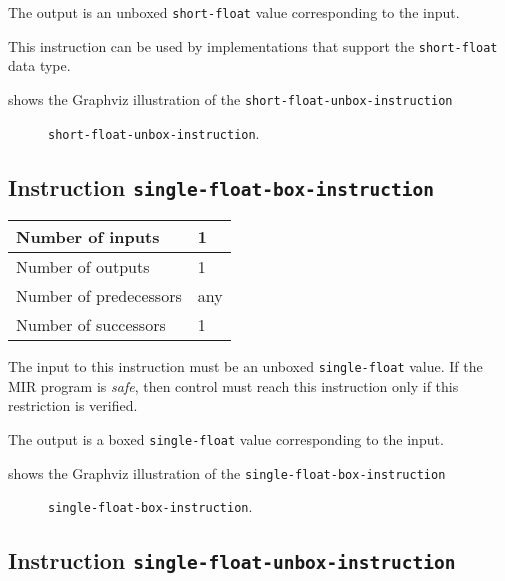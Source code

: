 The output is an unboxed \texttt{short-float} value corresponding to
the input.

This instruction can be used by implementations that support the
\texttt{short-float} data type.   

 shows the Graphviz illustration of the
\texttt{short-float-unbox-instruction}

\begin{figure}
\begin{center}
\end{center}
\caption{\label{fig-short-float-unbox-instruction}
\texttt{short-float-unbox-instruction}.}
\end{figure}

\subsection{Instruction \texttt{single-float-box-instruction}}
\label{mir-instruction-single-float-box}

\begin{tabular}{|l|l|}
\hline
Number of inputs & 1\\
\hline
Number of outputs & 1\\
\hline
Number of predecessors & any\\
\hline
Number of successors & 1\\
\hline
\end{tabular}

The input to this instruction must be an unboxed \texttt{single-float}
value.  If the MIR program is \emph{safe}, then control must reach
this instruction only if this restriction is verified.

The output is a boxed \texttt{single-float} value corresponding to the
input.

 shows the Graphviz illustration of the
\texttt{single-float-box-instruction}

\begin{figure}
\begin{center}
\end{center}
\caption{\label{fig-single-float-box-instruction}
\texttt{single-float-box-instruction}.}
\end{figure}

\subsection{Instruction \texttt{single-float-unbox-instruction}}
\label{mir-instruction-single-float-unbox}

